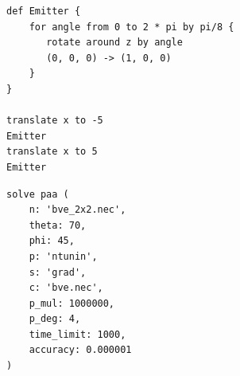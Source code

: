 \begin{lstlisting}[caption={Группы команд}, label={experiment}]
def Emitter {
    for angle from 0 to 2 * pi by pi/8 {
       rotate around z by angle
       (0, 0, 0) -> (1, 0, 0)
    }
}

translate x to -5
Emitter
translate x to 5
Emitter
\end{lstlisting}

\begin{lstlisting}[caption={Оптимизация направленности ФАР}, label={experiment}]
solve paa (
    n: 'bve_2x2.nec',
    theta: 70,
    phi: 45,
    p: 'ntunin',
    s: 'grad',
    c: 'bve.nec',
    p_mul: 1000000,
    p_deg: 4,
    time_limit: 1000,
    accuracy: 0.000001
)
\end{lstlisting}



